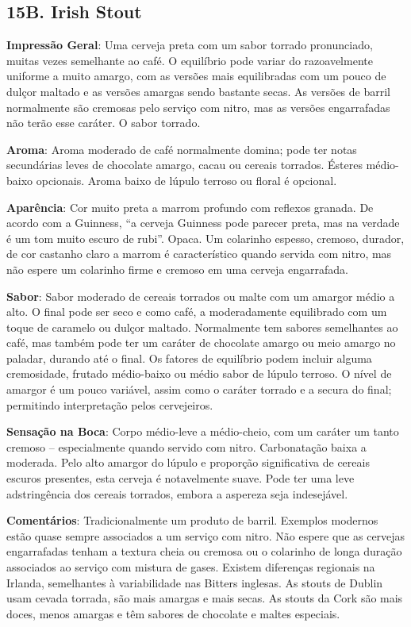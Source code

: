 \subsection*{15B. Irish Stout}
\textbf{Impressão Geral}: Uma cerveja preta com um sabor torrado pronunciado, muitas vezes semelhante ao café. O equilíbrio pode variar do razoavelmente uniforme a muito amargo, com as versões mais equilibradas com um pouco de dulçor maltado e as versões amargas sendo bastante secas. As versões de barril normalmente são cremosas pelo serviço com nitro, mas as versões engarrafadas não terão esse caráter. O sabor torrado.

\textbf{Aroma}: Aroma moderado de café normalmente domina; pode ter notas secundárias leves de chocolate amargo, cacau ou cereais torrados. Ésteres médio-baixo opcionais. Aroma baixo de lúpulo terroso ou floral é opcional.

\textbf{Aparência}: Cor muito preta a marrom profundo com reflexos granada. De acordo com a Guinness, “a cerveja Guinness pode parecer preta, mas na verdade é um tom muito escuro de rubi”. Opaca. Um colarinho espesso, cremoso, durador, de cor castanho claro a marrom é característico quando servida com nitro, mas não espere um colarinho firme e cremoso em uma cerveja engarrafada.

\textbf{Sabor}: Sabor moderado de cereais torrados ou malte com um amargor médio a alto. O final pode ser seco e como café, a moderadamente equilibrado com um toque de caramelo ou dulçor maltado. Normalmente tem sabores semelhantes ao café, mas também pode ter um caráter de chocolate amargo ou meio amargo no paladar, durando até o final. Os fatores de equilíbrio podem incluir alguma cremosidade, frutado médio-baixo ou médio sabor de lúpulo terroso. O nível de amargor é um pouco variável, assim como o caráter torrado e a secura do final; permitindo interpretação pelos cervejeiros.

\textbf{Sensação na Boca}: Corpo médio-leve a médio-cheio, com um caráter um tanto cremoso – especialmente quando servido com nitro. Carbonatação baixa a moderada. Pelo alto amargor do lúpulo e proporção significativa de cereais escuros presentes, esta cerveja é notavelmente suave. Pode ter uma leve adstringência dos cereais torrados, embora a aspereza seja indesejável.

\textbf{Comentários}: Tradicionalmente um produto de barril. Exemplos modernos estão quase sempre associados a um serviço com nitro. Não espere que as cervejas engarrafadas tenham a textura cheia ou cremosa ou o colarinho de longa duração associados ao serviço com mistura de gases. Existem diferenças regionais na Irlanda, semelhantes à variabilidade nas Bitters inglesas. As stouts de Dublin usam cevada torrada, são mais amargas e mais secas. As stouts da Cork são mais doces, menos amargas e têm sabores de chocolate e maltes especiais.

